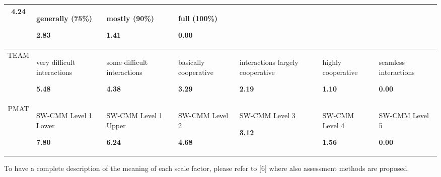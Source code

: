 \begin{center}
\begin{tabular}{c|>{\centering}p{1.5cm}|>{\centering}p{1.5cm}|>{\centering}p{1.5cm}|>{\centering}p{1.5cm}|>{\centering}p{1.5cm}|>{\centering}p{1.5cm}}
\textbf{\small{}4.24} & {\small{}generally (75\%) }{\small \par}

\textbf{\small{}2.83} & {\small{}mostly (90\%) }{\small \par}

\textbf{\small{}1.41} & {\small{}full (100\%)}{\small \par}

\textbf{\small{}0.00}\tabularnewline
\hline 
TEAM  & {\small{}very difficult interactions }{\small \par}

\textbf{\small{}5.48} & {\small{}some difficult interactions }{\small \par}

\textbf{\small{}4.38} & {\small{}basically cooperative }{\small \par}

\textbf{\small{}3.29} & {\small{}interactions largely cooperative }{\small \par}

\textbf{\small{}2.19} & {\small{}highly cooperative }{\small \par}

\textbf{\small{}1.10} & {\small{}seamless interactions }{\small \par}

\textbf{\small{}0.00}\tabularnewline
\hline 
PMAT  & {\small{}SW-CMM Level 1 Lower}{\small \par}

\textbf{\small{}7.80} & {\small{}SW-CMM Level 1 Upper }{\small \par}

\textbf{\small{}6.24} & {\small{}SW-CMM Level 2 }{\small \par}

\textbf{\small{}4.68} & {\small{}SW-CMM Level 3 }{\small \par}

\textbf{\small{}3.12} & {\small{}SW-CMM Level 4 }{\small \par}

\textbf{\small{}1.56} & {\small{}SW-CMM Level 5 }{\small \par}

\textbf{\small{}0.00}\tabularnewline
\hline 
\end{tabular}
\par\end{center}

\medskip{}


To have a complete description of the meaning of each scale factor,
please refer to {[}6{]} where also assessment methods are proposed. 

